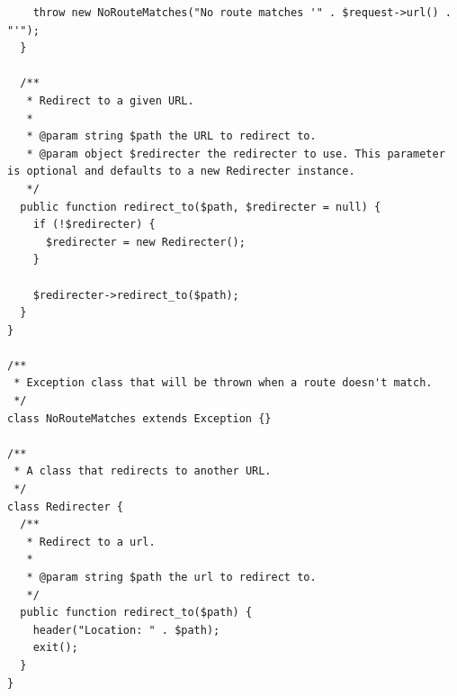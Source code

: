 \documentclass[12pt]{article}
\begin{document}
\begin{verbatim}
    throw new NoRouteMatches("No route matches '" . $request->url() . "'");
  }

  /**
   * Redirect to a given URL.
   *
   * @param string $path the URL to redirect to.
   * @param object $redirecter the redirecter to use. This parameter is optional and defaults to a new Redirecter instance.
   */
  public function redirect_to($path, $redirecter = null) {
    if (!$redirecter) {
      $redirecter = new Redirecter();
    }

    $redirecter->redirect_to($path);
  }
}

/**
 * Exception class that will be thrown when a route doesn't match.
 */
class NoRouteMatches extends Exception {}

/**
 * A class that redirects to another URL.
 */
class Redirecter {
  /**
   * Redirect to a url.
   *
   * @param string $path the url to redirect to.
   */
  public function redirect_to($path) {
    header("Location: " . $path);
    exit();
  }
}
\end{verbatim}
\end{document}
